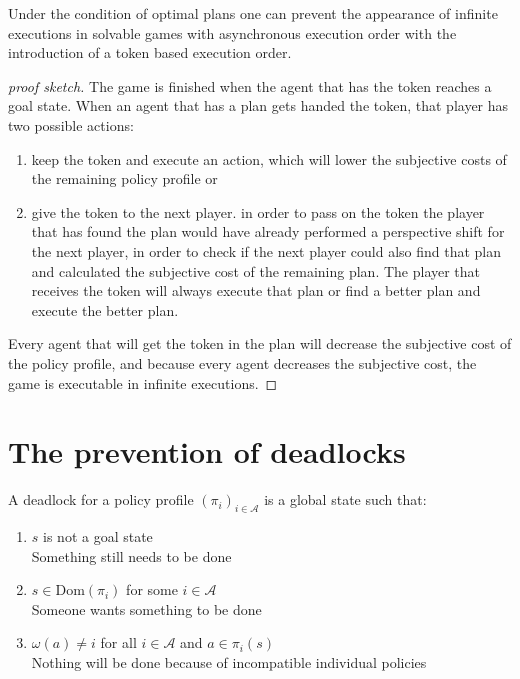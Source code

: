 \begin{theorem}
Under the condition of optimal plans one can prevent the appearance of infinite executions in solvable games with asynchronous execution order with the introduction of a token based execution order.
\end{theorem}

\begin{proof}[proof sketch]
  The game is finished when the agent that has the token reaches a goal state. When an agent that has a plan gets handed the token, that player has two possible actions:
  \begin{enumerate}
    \item keep the token and execute an action, which will lower the subjective costs of the remaining policy profile or
    \item give the token to the next player. in order to pass on the token the player that has found the plan would have already performed a perspective shift for the next player, in order to check if the next player could also find that plan and calculated the subjective cost of the remaining plan. The player that receives the token will always execute that plan or find a better plan and execute the better plan.
  \end{enumerate}
  Every agent that will get the token in the plan will decrease the subjective cost of the policy profile, and because every agent decreases the subjective cost, the game is executable in infinite executions.
\end{proof}

\section{The prevention of deadlocks}

A deadlock for a policy profile $(\pi_i)_{i \in \mathcal{A}}$ is a global state such that:
\begin{enumerate}
  \item $s$ is not a goal state \\
    Something still needs to be done
  \item $s \in \text{Dom}(\pi_i)$ for some $i \in \mathcal{A}$ \\
    Someone wants something to be done
  \item $\omega(a) \neq i$ for all $i \in \mathcal{A}$ and $a \in \pi_i(s)$ \\
    Nothing will be done because of incompatible individual policies
\end{enumerate}

